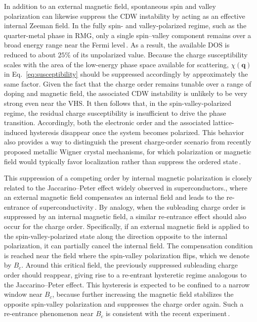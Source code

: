 \documentclass[aps,prx,article,twocolumn,amsmath,amssymb,superscriptaddress,longbibliography]{revtex4-2}
\begin{document}
In addition to an external magnetic field, spontaneous spin and valley polarization can likewise suppress the CDW instability by acting as an effective internal Zeeman field. In the fully spin- and valley-polarized regime, such as the quarter-metal phase in RMG, only a single spin--valley component remains over a broad energy range near the Fermi level\,\cite{huang2023spin, koh2024correlated, parramartinez2025band, miao2026various}. As a result, the available DOS is reduced to about $25\%$ of its unpolarized value. Because the charge susceptibility scales with the area of the low-energy phase space available for scattering, $\chi(\mathbf{q})$ in Eq.~\eqref{eq:susceptibility} should be suppressed accordingly by approximately the same factor. Given the fact that the charge order remains tunable over a range of doping and magnetic field, the associated CDW instability is unlikely to be very strong even near the VHS. It then follows that, in the spin-valley-polarized regime, the residual charge susceptibility is insufficient to drive the phase transition. Accordingly, both the electronic order and the associated lattice-induced hysteresis disappear once the system becomes polarized. This behavior also provides a way to distinguish the present charge-order scenario from recently proposed metallic Wigner crystal mechanisms, for which polarization or magnetic field would typically favor localization rather than suppress the ordered state\,\cite{dong2026crystals,feng2026self}.

This suppression of a competing order by internal magnetic polarization is closely related to the Jaccarino--Peter effect widely observed in superconductors., where an external magnetic field compensates an internal field and leads to the re-entrance of superconductivity\,\cite{jaccarino1962ultra,meul1984observation,ran2019extreme,helm2024field,yang2026field,vu2026re}. By analogy, when the subleading charge order is suppressed by an internal magnetic field, a similar re-entrance effect should also occur for the charge order. Specifically, if an external magnetic field is applied to the spin-valley-polarized state along the direction opposite to the internal polarization, it can partially cancel the internal field. The compensation condition is reached near the field where the spin-valley polarization flips, which we denote by $B_c$. Around this critical field, the previously suppressed subleading charge order should reappear, giving rise to a re-entrant hysteretic regime analogous to the Jaccarino--Peter effect. This hysteresis is expected to be confined to a narrow window near $B_c$, because further increasing the magnetic field stabilizes the opposite spin-valley polarization and suppresses the charge order again. Such a re-entrance phenomenon near $B_c$ is consistent with the recent experiment\,\cite{zhao2026hysteretical}.
\end{document}
